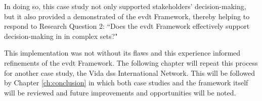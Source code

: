 In doing so, this case study not only supported stakeholders' decision-making, but it also provided a demonstrated of the \ac{evdt} Framework, thereby helping to respond to Research Question 2: ``Does the \ac{evdt} Framework effectively support decision-making in in complex \ac{sets}?"

This implementation was not without its flaws and this experience informed refinements of the \ac{evdt} Framework. The following chapter will repeat this process for another case study, the Vida \ac{dss} International Network. This will be followed by Chapter \ref{ch:conclusion} in which both case studies and the framework itself will be reviewed and future improvements and opportunities will be noted.




